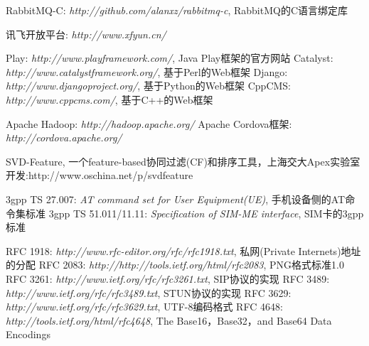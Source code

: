 \documentclass[a4paper]{book}
\begin{document}
\begin{thebibliography}{99}
 RabbitMQ-C: {\em http://github.com/alanxz/rabbitmq-c}, RabbitMQ的C语言绑定库

 讯飞开放平台: {\em http://www.xfyun.cn/} 

 Play: {\em http://www.playframework.com/}, Java Play框架的官方网站
 Catalyst: {\em http://www.catalystframework.org/}, 基于Perl的Web框架
 Django: {\em http://www.djangoproject.org/}, 基于Python的Web框架
 CppCMS: {\em http://www.cppcms.com/}, 基于C++的Web框架

 Apache Hadoop: {\em http://hadoop.apache.org/}
 Apache Cordova框架: {\em http://cordova.apache.org/}

 SVD-Feature, 一个feature-based协同过滤(CF)和排序工具，上海交大Apex实验室开发:{http://www.oschina.net/p/svdfeature}


 3gpp TS 27.007: {\em AT command set for User Equipment(UE)}, 手机设备侧的AT命令集标准
 3gpp TS 51.011/11.11: {\em Specification of SIM-ME interface}, SIM卡的3gpp标准

 RFC 1918: {\em http://www.rfc-editor.org/rfc/rfc1918.txt}, 私网(Private Internets)地址的分配
 RFC 2083: {\em http://http://tools.ietf.org/html/rfc2083}, PNG格式标准1.0
 RFC 3261: {\em http://www.ietf.org/rfc/rfc3261.txt}, SIP协议的实现
 RFC 3489: {\em http://www.ietf.org/rfc/rfc3489.txt}, STUN协议的实现
 RFC 3629: {\em http://www.ietf.org/rfc/rfc3629.txt}, UTF-8编码格式
 RFC 4648: {\em http://tools.ietf.org/html/rfc4648}, The Base16，Base32，and Base64 Data Encodings
\end{thebibliography}


\cleardoublepage
{}

\printglossaries

\printindex



\end{document}
